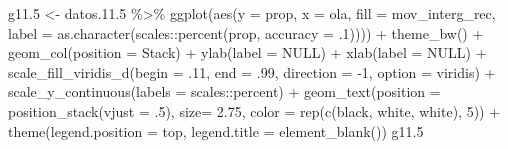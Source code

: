 \documentclass[
  12pt,
]{book}
\newenvironment{Shaded}{\begin{snugshade}}{\end{snugshade}}
\newcommand{\AttributeTok}[1]{\textcolor[rgb]{0.77,0.63,0.00}{#1}}
\newcommand{\ConstantTok}[1]{\textcolor[rgb]{0.00,0.00,0.00}{#1}}
\newcommand{\DecValTok}[1]{\textcolor[rgb]{0.00,0.00,0.81}{#1}}
\newcommand{\FloatTok}[1]{\textcolor[rgb]{0.00,0.00,0.81}{#1}}
\newcommand{\FunctionTok}[1]{\textcolor[rgb]{0.00,0.00,0.00}{#1}}
\newcommand{\NormalTok}[1]{#1}
\newcommand{\OtherTok}[1]{\textcolor[rgb]{0.56,0.35,0.01}{#1}}
\newcommand{\SpecialCharTok}[1]{\textcolor[rgb]{0.00,0.00,0.00}{#1}}
\newcommand{\StringTok}[1]{\textcolor[rgb]{0.31,0.60,0.02}{#1}}
\begin{document}
\begin{Shaded}
\begin{Highlighting}[]
\NormalTok{g11}\FloatTok{.5} \OtherTok{\textless{}{-}} 
\NormalTok{  datos.}\FloatTok{11.5} \SpecialCharTok{\%\textgreater{}\%} 
  \FunctionTok{ggplot}\NormalTok{(}\FunctionTok{aes}\NormalTok{(}\AttributeTok{y =}\NormalTok{ prop, }\AttributeTok{x =}\NormalTok{ ola, }\AttributeTok{fill =}\NormalTok{ mov\_interg\_rec, }
             \AttributeTok{label =} \FunctionTok{as.character}\NormalTok{(scales}\SpecialCharTok{::}\FunctionTok{percent}\NormalTok{(prop, }\AttributeTok{accuracy =}\NormalTok{ .}\DecValTok{1}\NormalTok{)))) }\SpecialCharTok{+} 
  \FunctionTok{theme\_bw}\NormalTok{() }\SpecialCharTok{+} 
  \FunctionTok{geom\_col}\NormalTok{(}\AttributeTok{position =} \StringTok{\textquotesingle{}Stack\textquotesingle{}}\NormalTok{) }\SpecialCharTok{+}
  \FunctionTok{ylab}\NormalTok{(}\AttributeTok{label =} \ConstantTok{NULL}\NormalTok{) }\SpecialCharTok{+}
  \FunctionTok{xlab}\NormalTok{(}\AttributeTok{label =} \ConstantTok{NULL}\NormalTok{) }\SpecialCharTok{+}
  \FunctionTok{scale\_fill\_viridis\_d}\NormalTok{(}\AttributeTok{begin =}\NormalTok{ .}\DecValTok{11}\NormalTok{, }\AttributeTok{end =}\NormalTok{ .}\DecValTok{99}\NormalTok{, }\AttributeTok{direction =} \SpecialCharTok{{-}}\DecValTok{1}\NormalTok{, }\AttributeTok{option =} \StringTok{\textquotesingle{}viridis\textquotesingle{}}\NormalTok{) }\SpecialCharTok{+}
  \FunctionTok{scale\_y\_continuous}\NormalTok{(}\AttributeTok{labels =}\NormalTok{ scales}\SpecialCharTok{::}\NormalTok{percent) }\SpecialCharTok{+} 
  \FunctionTok{geom\_text}\NormalTok{(}\AttributeTok{position =} \FunctionTok{position\_stack}\NormalTok{(}\AttributeTok{vjust =}\NormalTok{ .}\DecValTok{5}\NormalTok{),}
            \AttributeTok{size=} \FloatTok{2.75}\NormalTok{, }\AttributeTok{color =} \FunctionTok{rep}\NormalTok{(}\FunctionTok{c}\NormalTok{(}\StringTok{\textquotesingle{}black\textquotesingle{}}\NormalTok{, }\StringTok{\textquotesingle{}white\textquotesingle{}}\NormalTok{, }\StringTok{\textquotesingle{}white\textquotesingle{}}\NormalTok{), }\DecValTok{5}\NormalTok{)) }\SpecialCharTok{+} 
  \FunctionTok{theme}\NormalTok{(}\AttributeTok{legend.position =} \StringTok{\textquotesingle{}top\textquotesingle{}}\NormalTok{,}
        \AttributeTok{legend.title =} \FunctionTok{element\_blank}\NormalTok{())}
\NormalTok{g11}\FloatTok{.5}
\end{Highlighting}
\end{Shaded}
\end{document}
